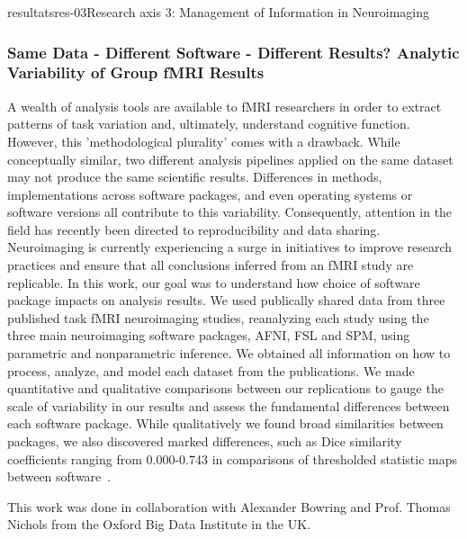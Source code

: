 \documentclass{ra2018}
\begin{document}
\begin{module}{resultats}{res-03}{Research axis 3: Management of Information in Neuroimaging}
\subsubsection{Same Data - Different Software - Different Results? Analytic Variability of Group fMRI Results}
\begin{participants}
\end{participants}
A wealth of analysis tools are available to fMRI researchers in order to extract patterns of task variation and, ultimately, understand cognitive function. However, this 'methodological plurality' comes with a drawback. While conceptually similar, two different analysis pipelines applied on the same dataset may not produce the same scientific results. Differences in methods, implementations across software packages, and even operating systems or software versions all contribute to this variability. Consequently, attention in the field has recently been directed to reproducibility and data sharing. Neuroimaging is currently experiencing a surge in initiatives to improve research practices and ensure that all conclusions inferred from an fMRI study are replicable. In this work, our goal was to understand how choice of software package impacts on analysis results. We used publically shared data from three published task fMRI neuroimaging studies, reanalyzing each study using the three main neuroimaging software packages, AFNI, FSL and SPM, using parametric and nonparametric inference. We obtained all information on how to process, analyze, and model each dataset from the publications. We made quantitative and qualitative comparisons between our replications to gauge the scale of variability in our results and assess the fundamental differences between each software package. While qualitatively we found broad similarities between packages, we also discovered marked differences, such as Dice similarity coefficients ranging from 0.000-0.743 in comparisons of thresholded statistic maps between software~\cite{bowring:inserm-01933019,bowring:inserm-01760535}.

This work was done in collaboration with Alexander Bowring and Prof. Thomas Nichols from the Oxford Big Data Institute in the UK.


\end{module}
\end{document}
